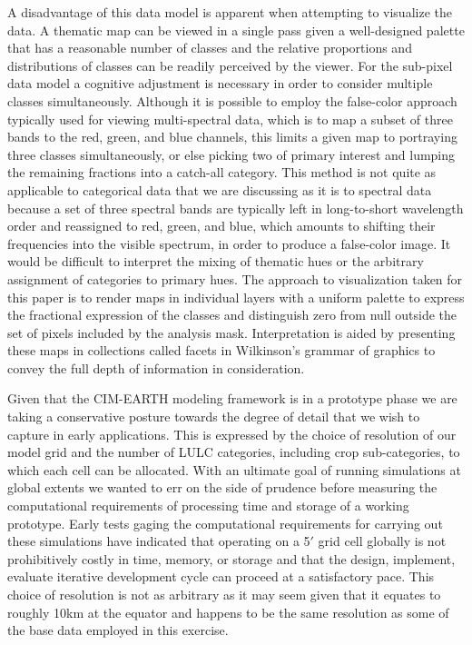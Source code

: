 A disadvantage of this data model is apparent when attempting to
visualize the data.  A thematic map can be viewed in a single pass
given a well-designed palette that has a reasonable number of classes
and the relative proportions and distributions of classes can be
readily perceived by the viewer.  For the sub-pixel data model a
cognitive adjustment is necessary in order to consider multiple
classes simultaneously.  Although it is possible to employ the
false-color approach typically used for viewing multi-spectral data,
which is to map a subset of three bands to the red, green, and blue
channels, this limits a given map to portraying three classes
simultaneously, or else picking two of primary interest and lumping
the remaining fractions into a catch-all category.  This method is not
quite as applicable to categorical data that we are discussing as it
is to spectral data because a set of three spectral bands are
typically left in long-to-short wavelength order and reassigned to
red, green, and blue, which amounts to shifting their frequencies into
the visible spectrum, in order to produce a false-color image.  It
would be difficult to interpret the mixing of thematic hues or the
arbitrary assignment of categories to primary hues.  The approach to
visualization taken for this paper is to render maps in individual
layers with a uniform palette to express the fractional expression of
the classes and distinguish zero from null outside the set of pixels
included by the analysis mask.  Interpretation is aided by presenting
these maps in collections called facets in Wilkinson's
\citeyearpar{Wilkinson2005} grammar of graphics to convey the full
depth of information in consideration.

Given that the CIM-EARTH modeling framework is in a prototype phase we
are taking a conservative posture towards the degree of detail that we
wish to capture in early applications.  This is expressed by the
choice of resolution of our model grid and the number of LULC
categories, including crop sub-categories, to which each cell can be
allocated.  With an ultimate goal of running simulations at global
extents we wanted to err on the side of prudence before measuring the
computational requirements of processing time and storage of a working
prototype.  Early tests gaging the computational requirements for
carrying out these simulations have indicated that operating on a 5$'$
grid cell globally is not prohibitively costly in time, memory, or
storage and that the design, implement, evaluate iterative development
cycle can proceed at a satisfactory pace.   This choice of resolution is not as
arbitrary as it may seem given that it equates to roughly 10km at the
equator and happens to be the same resolution as some of the base data
employed in this exercise.

